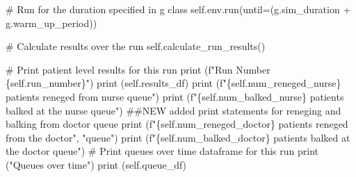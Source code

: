\documentclass[
  letterpaper,
  DIV=11,
  numbers=noendperiod]{scrreprt}
\newenvironment{Shaded}{\begin{snugshade}}{\end{snugshade}}
\newcommand{\BuiltInTok}[1]{\textcolor[rgb]{0.00,0.23,0.31}{#1}}
\newcommand{\CommentTok}[1]{\textcolor[rgb]{0.37,0.37,0.37}{#1}}
\newcommand{\NormalTok}[1]{\textcolor[rgb]{0.00,0.23,0.31}{#1}}
\newcommand{\OperatorTok}[1]{\textcolor[rgb]{0.37,0.37,0.37}{#1}}
\newcommand{\SpecialCharTok}[1]{\textcolor[rgb]{0.37,0.37,0.37}{#1}}
\newcommand{\SpecialStringTok}[1]{\textcolor[rgb]{0.13,0.47,0.30}{#1}}
\newcommand{\StringTok}[1]{\textcolor[rgb]{0.13,0.47,0.30}{#1}}
\newcommand{\VariableTok}[1]{\textcolor[rgb]{0.07,0.07,0.07}{#1}}
\begin{document}
\begin{tcolorbox}
\begin{Shaded}
\begin{Highlighting}[]
        \CommentTok{\# Run for the duration specified in g class}
        \VariableTok{self}\NormalTok{.env.run(until}\OperatorTok{=}\NormalTok{(g.sim\_duration }\OperatorTok{+}\NormalTok{ g.warm\_up\_period))}

        \CommentTok{\# Calculate results over the run}
        \VariableTok{self}\NormalTok{.calculate\_run\_results()}

        \CommentTok{\# Print patient level results for this run}
        \BuiltInTok{print}\NormalTok{ (}\SpecialStringTok{f"Run Number }\SpecialCharTok{\{}\VariableTok{self}\SpecialCharTok{.}\NormalTok{run\_number}\SpecialCharTok{\}}\SpecialStringTok{"}\NormalTok{)}
        \BuiltInTok{print}\NormalTok{ (}\VariableTok{self}\NormalTok{.results\_df)}
        \BuiltInTok{print}\NormalTok{ (}\SpecialStringTok{f"}\SpecialCharTok{\{}\VariableTok{self}\SpecialCharTok{.}\NormalTok{num\_reneged\_nurse}\SpecialCharTok{\}}\SpecialStringTok{ patients reneged from nurse queue"}\NormalTok{)}
        \BuiltInTok{print}\NormalTok{ (}\SpecialStringTok{f"}\SpecialCharTok{\{}\VariableTok{self}\SpecialCharTok{.}\NormalTok{num\_balked\_nurse}\SpecialCharTok{\}}\SpecialStringTok{ patients balked at the nurse queue"}\NormalTok{)}
        \CommentTok{\#\#NEW added print statements for reneging and balking from doctor queue}
        \BuiltInTok{print}\NormalTok{ (}\SpecialStringTok{f"}\SpecialCharTok{\{}\VariableTok{self}\SpecialCharTok{.}\NormalTok{num\_reneged\_doctor}\SpecialCharTok{\}}\SpecialStringTok{ patients reneged from the doctor"}\NormalTok{,}
               \StringTok{"queue"}\NormalTok{)}
        \BuiltInTok{print}\NormalTok{ (}\SpecialStringTok{f"}\SpecialCharTok{\{}\VariableTok{self}\SpecialCharTok{.}\NormalTok{num\_balked\_doctor}\SpecialCharTok{\}}\SpecialStringTok{ patients balked at the doctor queue"}\NormalTok{)}
        \CommentTok{\# Print queues over time dataframe for this run}
        \BuiltInTok{print}\NormalTok{ (}\StringTok{"Queues over time"}\NormalTok{)}
        \BuiltInTok{print}\NormalTok{ (}\VariableTok{self}\NormalTok{.queue\_df)}


\end{Highlighting}
\end{Shaded}
\end{tcolorbox}
\end{document}
